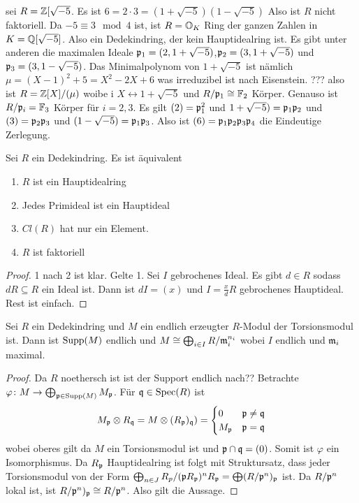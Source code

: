 \begin{Bsp} sei \(R=\mathbb{Z}[\sqrt{-5}\). Es ist \(6=2\cdot 3=(1+\sqrt{-5})(1-\sqrt{-5})\)
	Also ist  \(R\) nicht faktoriell. Da \(-5\equiv 3 \mod 4\) ist, ist \(R=\mathbb{O}_K\) Ring der ganzen Zahlen in 
	\(K=\mathbb{Q}[\sqrt{-5}]\). Also ein Dedekindring, der kein Hauptidealring ist.
	Es gibt unter anderen die maximalen Ideale 
	\(\mathfrak{p}_1=(2,1+\sqrt{-5})\),\(\mathfrak{p}_2=(3,1+\sqrt{-5})\) und \(\mathfrak{p}_3=(3,1-\sqrt{-5})\).
	Das Minimalpolynom von \(1+\sqrt{-5}\) ist nämlich \(\mu=(X-1)^2+5=X^2-2X+6\) was irreduzibel ist nach Eisenstein. ???
	also ist \(R=\mathbb{Z}[X]/(\mu)\) woibe i \(X\leftrightarrow 1+\sqrt{-5}\) und \(R/\mathfrak{p}_1\cong \mathbb{F}_2\) Körper.
	Genauso ist \(R/\mathfrak{p}_i=\mathbb{F}_3\) Körper für \(i=2,3\).
	Es gilt \((2)=\mathfrak{p}_1^2\) und \(1+\sqrt{-5})=\mathfrak{p}_1\mathfrak{p}_2\) und \((3)=\mathfrak{p}_2\mathfrak{p}_3\) und 
	\((1-\sqrt{-5})=\mathfrak{p}_1\mathfrak{p}_3\). Also ist \((6)=\mathfrak{p}_1\mathfrak{p}_2\mathfrak{p}_3\mathfrak{p}_4\) die Eindeutige Zerlegung.
	
\end{Bsp}

\begin{Lemma}
	Sei \(R\) ein Dedekindring. Es ist äquivalent
	\begin{enumerate}
		\item \(R\) ist ein Hauptidealring
		\item Jedes Primideal ist ein Hauptideal 
		\item \(Cl(R)\) hat nur ein Element.
		\item \(R\) ist faktoriell
	\end{enumerate}
\end{Lemma}
\begin{proof}
	1 nach 2 ist klar. Gelte 1. Sei \(I\) gebrochenes Ideal. Es gibt \(d\in R\) sodass \(dR\subseteq R\) ein Ideal ist.
	Dann ist \(dI=(x)\) und \(I=\frac x d R\) gebrochenes Hauptideal. Rest ist einfach.
\end{proof}
\begin{Satz} Sei \(R\) ein Dedekindring und \(M\) ein endlich erzeugter \(R\)-Modul der Torsionsmodul ist.
	Dann ist \(\operatorname{Supp}(M)\) endlich und \(M\cong \bigoplus_{i\in I}R/\mathfrak{m}_i^{n_i}\) wobei \(I\) endlich und \(\mathfrak{m}_i\) maximal.
	
\end{Satz}
\begin{proof}
	Da \(R\) noethersch ist ist der Support endlich nach??
	Betrachte \(\varphi\colon M\to \bigoplus_{\mathfrak{p}\in\operatorname{Supp}(M)}M_{\mathfrak{p}}\). 
	Für \(\mathfrak{q}\in\operatorname{Spec}(R)\) ist \[M_{\mathfrak{p}}\otimes R_{\mathfrak{q}}=M\otimes (R_{\mathfrak{p}})_{\mathfrak{q}})=
	\begin{cases} 0 & \mathfrak{p}\neq \mathfrak{q}\\ 
		M_{\mathfrak{p}} & \mathfrak{p}=\mathfrak{q}\\
	\end{cases}\]
	wobei oberes gilt da \(M\) ein Torsionsmodul ist und \(\mathfrak{p}\cap\mathfrak{q}=(0)\).
	Somit ist \(\varphi\) ein Isomorphismus.
	Da \(R_{\mathfrak{p}}\) Hauptidealring ist folgt mit Struktursatz, dass jeder Torsionsmodul von der Form
	\(\bigoplus_{n\in J}R_p/(\mathfrak{p} R_{\mathfrak{p}})^nR_{\mathfrak{p}}=\bigoplus (R/\mathfrak{p}^n)_{\mathfrak{p}}\) ist.
	Da \(R/\mathfrak{p}^n\) lokal ist, ist \(R/\mathfrak{p}^n)_{\mathfrak{p}}\cong R/\mathfrak{p}^n\). Also gilt die Aussage.
\end{proof}

